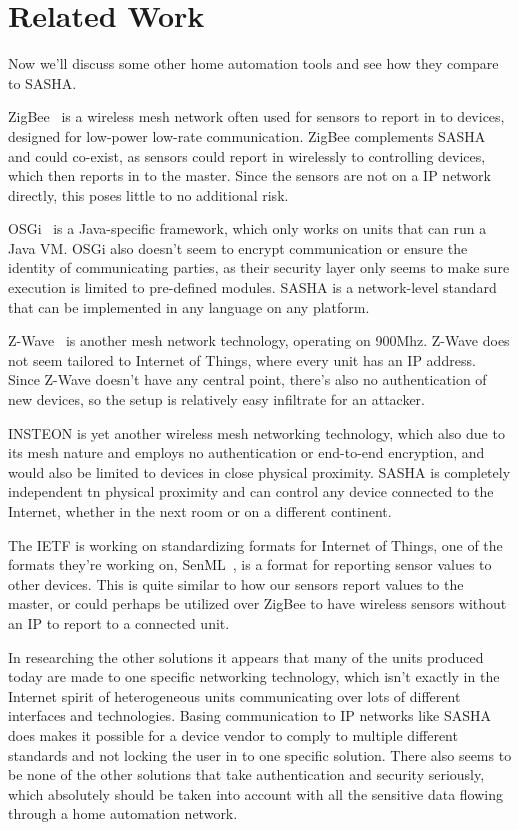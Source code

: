 \section{Related Work}

Now we'll discuss some other home automation tools and see how they compare to SASHA.

ZigBee~\cite{zigbee} is a wireless mesh network often used for sensors to report in to devices, designed for low-power low-rate communication. ZigBee complements SASHA and could co-exist, as sensors could report in wirelessly to controlling devices, which then reports in to the master. Since the sensors are not on a IP network directly, this poses little to no additional risk.

OSGi~\cite{osgi} is a Java-specific framework, which only works on units that can run a Java VM. OSGi also doesn't seem to encrypt communication or ensure the identity of communicating parties, as their security layer only seems to make sure execution is limited to pre-defined modules. SASHA is a network-level standard that can be implemented in any language on any platform.

Z-Wave~\cite[Annex~A]{z-wave} is another mesh network technology, operating on 900Mhz. Z-Wave does not seem tailored to Internet of Things, where every unit has an IP address. Since Z-Wave doesn't have any central point, there's also no authentication of new devices, so the setup is relatively easy infiltrate for an attacker.

INSTEON is yet another wireless mesh networking technology, which also due to its mesh nature and employs no authentication or end-to-end encryption, and would also be limited to devices in close physical proximity. SASHA is completely independent tn physical proximity and can control any device connected to the Internet, whether in the next room or on a different continent.

The IETF is working on standardizing formats for Internet of Things, one of the formats they're working on, SenML~\cite{senml}, is a format for reporting sensor values to other devices. This is quite similar to how our sensors report values to the master, or could perhaps be utilized over ZigBee to have wireless sensors without an IP to report to a connected unit.

In researching the other solutions it appears that many of the units produced today are made to one specific networking technology, which isn't exactly in the Internet spirit of heterogeneous units communicating over lots of different interfaces and technologies. Basing communication to IP networks like SASHA does makes it possible for a device vendor to comply to multiple different standards and not locking the user in to one specific solution. There also seems to be none of the other solutions that take authentication and security seriously, which absolutely should be taken into account with all the sensitive data flowing through a home automation network.


